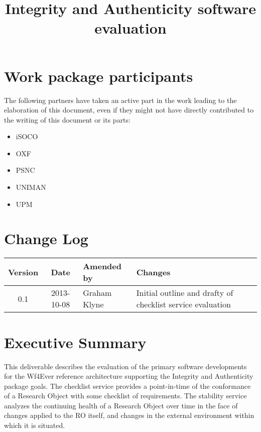 \documentclass[a4paper, twoside, 11pt]{article}
\title{Integrity and Authenticity software evaluation}
\begin{document}
\maketitle

\section*{Work package participants} The following partners have taken an active part in the work leading to the elaboration of this document, even if they might not have directly contributed to the writing of this document or its parts: %
\begin{itemize}
\item iSOCO
\item OXF
\item PSNC
\item UNIMAN
\item UPM
\end{itemize}

\section*{Change Log}
\begin{centering}

\begin{tabular}{|c|c|p{4.92cm}|p{6.5cm}|}

\hline \textbf{Version} & \textbf{Date} & \textbf{Amended by} & \textbf{Changes} \\ \hline
0.1 & 2013-10-08 & Graham Klyne & Initial outline and drafty of checklist service evaluation \\ \hline


\end{tabular}

\end{centering}
\clearpage

\section*{Executive Summary}
This deliverable describes the evaluation of the primary software developments for the Wf4Ever reference architecture supporting the Integrity and Authenticity package goals.  The checklist service provides a point-in-time of the conformance of a Research Object with some checklist of requirements.  The stability service analyzes the continuing health of a Research Object over time in the face of changes applied to the RO itself, and changes in the external environment within which it is situated.
\end{document}
